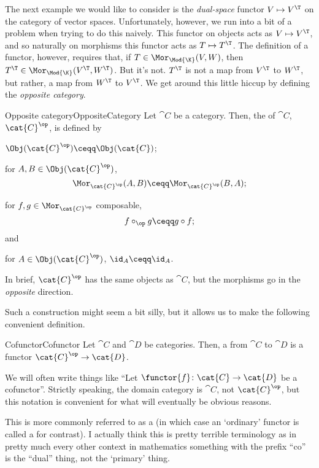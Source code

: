 The next example we would like to consider is the \emph{dual-space} functor $V\mapsto V^{\T}$ on the category of vector spaces.  Unfortunately, however, we run into a bit of a problem when trying to do this naively.  This functor on objects acts as $V\mapsto V^{\T}$, and so naturally on morphisms this functor acts as $T\mapsto T^{\T}$.  The definition of a functor, however, requires that, if $T\in \Mor _{\Mod{\K}}(V,W)$, then $T^{\T}\in \Mor _{\Mod{\K}}(V^{\T},W^{\T})$.  But it's not.  $T^{\T}$ is not a map from $V^{\T}$ to $W^{\T}$, but rather, a map from $W^{\T}$ to $V^{\T}$.  We get around this little hiccup by defining the \emph{opposite category}.
\begin{dfn}{Opposite category}{OppositeCategory}
	Let $\cat{C}$ be a category.  Then, the  of $\cat{C}$, $\cat{C}^{\op}$, is defined by
	\begin{data}
		\item $\Obj (\cat{C}^{\op})\ceqq \Obj (\cat{C})$;
		\item for $A,B\in \Obj (\cat{C}^{\op})$,
		\begin{equation}
			\Mor _{\cat{C}^{\op}}(A,B)\ceqq \Mor _{\cat{C}^{\op}}(B,A);
		\end{equation}
		\item for $f,g\in \Mor _{\cat{C}^{\op}}$ composable,
		\begin{equation}
			f\circ _{\op}g\ceqq g\circ f;
		\end{equation}
		and
		\item for $A\in \Obj (\cat{C}^{\op})$, $\id _A\ceqq \id _A$.
	\end{data}
	\begin{rmk}
		In brief, $\cat{C}^{\op}$ has the same objects as $\cat{C}$, but the morphisms go in the \emph{opposite} direction.
	\end{rmk}
\end{dfn}
Such a construction might seem a bit silly, but it allows us to make the following convenient definition.
\begin{dfn}{Cofunctor}{Cofunctor}
	Let $\cat{C}$ and $\cat{D}$ be categories.  Then, a  from $\cat{C}$ to $\cat{D}$ is a functor $\cat{C}^{\op}\rightarrow \cat{D}$.
	\begin{rmk}
		We will often write things like ``Let $\functor{f}\colon \cat{C}\rightarrow \cat{D}$ be a cofunctor\textellipsis ''.  Strictly speaking, the domain category is $\cat{C}$, not $\cat{C}^{\op}$, but this notation is convenient for what will eventually be obvious reasons.
	\end{rmk}
	\begin{rmk}
		This is more commonly referred to as a  (in which case an `ordinary' functor is called a  for contrast).  I actually think this is pretty terrible terminology as in pretty much every other context in mathematics something with the prefix ``co'' is the ``dual'' thing, not the `primary' thing.
	\end{rmk}
\end{dfn}
